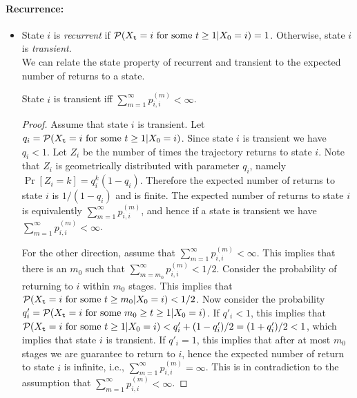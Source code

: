 \paragraph{Recurrence:}
\begin{itemize}
\item
State $i$ is \textit{recurrent} if ${\cal P}({X_{\tt t}} = i{
\textrm{ for some }}t \ge 1|{X_0} = i) = 1$. Otherwise, state $i$ is
\textit{transient}.\\
We can relate the state property of recurrent and transient to the
expected number of returns to a state.

\begin{claim}
State $i$ is transient iff $\sum\nolimits_{m = 1}^\infty
{p_{i,i}^{(m)}}  < \infty $.
\end{claim}

\begin{proof}
Assume that state $i$ is transient. Let $q_i={\cal P}({X_{\tt t}} =
i{ \textrm{ for some }}t \ge 1|{X_0} = i) $. Since state $i$ is
transient we have $q_i<1$. Let $Z_i$ be the number of times the
trajectory returns to state $i$. Note that $Z_i$ is geometrically
distributed with parameter $q_i$, namely $\Pr[Z_i=k]=q_i^k (1-q_i)$.
Therefore the expected number of returns to state $i$ is $1/(1-q_i)$
and is finite.
%
The expected number of returns to state $i$ is equivalently
$\sum\nolimits_{m = 1}^\infty {p_{i,i}^{(m)}} $, and hence if a
state is transient we have $\sum\nolimits_{m = 1}^\infty
{p_{i,i}^{(m)}}  < \infty $.

For the other direction, assume that $\sum\nolimits_{m = 1}^\infty
{p_{i,i}^{(m)}}  < \infty $. This implies that there is an $m_0$
such that $\sum\nolimits_{m = m_0}^\infty {p_{i,i}^{(m)}}  < 1/2$.
Consider the probability of returning to $i$ within $m_0$ stages.
This implies that ${\cal P}({X_{\tt t}} = i{ \textrm{ for some }}t
\ge m_0|{X_0} = i)< 1/2$. Now consider the probability $q'_i={\cal
P}({X_{\tt t}} = i{ \textrm{ for some }}m_0\geq t \ge 1|{X_0} = i) $.
%
If $q'_i<1$, this implies that ${\cal P}({X_{\tt t}} = i{ \textrm{
for some }}t \ge 1|{X_0} = i)<q'_i +(1-q'_i)/2=(1+q'_i)/2<1$, which
implies that state $i$ is transient.
%
If $q'_i=1$, this implies that after at most $m_0$ stages we are
guarantee to return to $i$, hence the expected number of return to
state $i$ is infinite, i.e., $\sum\nolimits_{m = 1}^\infty
{p_{i,i}^{(m)}}  = \infty $. This is in contradiction to the
assumption that $\sum\nolimits_{m = 1}^\infty {p_{i,i}^{(m)}}  <
\infty $.
\end{proof}



\end{itemize}
